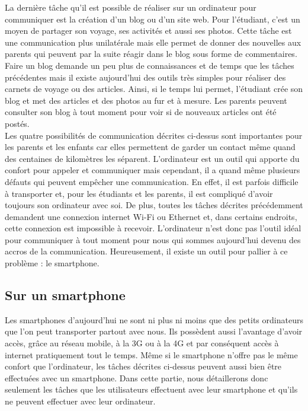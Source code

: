 \documentclass[12pt]{article}
\begin{document}
La dernière tâche qu'il est possible de réaliser sur un ordinateur pour communiquer est la création d'un blog ou d'un site web. Pour l'étudiant, c'est un moyen de partager son voyage, ses activités et aussi ses photos. Cette tâche est une communication plus unilatérale mais elle permet de donner des nouvelles aux parents qui peuvent par la suite réagir dans le blog sous forme de commentaires. Faire un blog demande  un peu plus de connaissances et de temps que les tâches précédentes mais il existe aujourd'hui des outils très simples pour réaliser des carnets de voyage ou des articles. Ainsi, si le temps lui permet, l'étudiant crée son blog et met des articles et des photos au fur et à mesure. Les parents peuvent consulter son blog à tout moment pour voir si de nouveaux articles ont été postés. ~\\

Les quatre possibilités de communication décrites ci-dessus sont importantes pour les parents et les enfants car elles permettent de garder un contact même quand des centaines de kilomètres les séparent. L'ordinateur est un outil qui apporte du confort pour appeler et communiquer mais cependant, il a quand même plusieurs défauts qui peuvent empêcher une communication. En effet, il est parfois difficile à transporter et, pour les étudiants et les parents, il est compliqué d'avoir toujours son ordinateur avec soi. De plus, toutes les tâches décrites précédemment demandent une connexion internet Wi-Fi ou Ethernet et, dans certains endroits, cette connexion est impossible à recevoir. L'ordinateur n'est donc pas l'outil idéal pour communiquer à tout moment pour nous qui sommes aujourd'hui devenu des accros de la communication. Heureusement, il existe un outil pour pallier à ce problème : le smartphone.

\subsection{Sur un smartphone}
Les smartphones d'aujourd'hui ne sont ni plus ni moins que des petits ordinateurs que l'on peut transporter partout avec nous. Ils possèdent aussi l'avantage d'avoir accès, grâce au réseau mobile, à la 3G ou à la 4G et par conséquent accès à internet pratiquement tout le temps. Même si le smartphone n'offre pas le même confort que l'ordinateur, les tâches décrites ci-dessus peuvent aussi bien être effectuées avec un smartphone. Dans cette partie, nous détaillerons donc seulement les tâches que les utilisateurs effectuent avec leur smartphone et qu'ils ne peuvent effectuer avec leur ordinateur. ~\\
\end{document}

